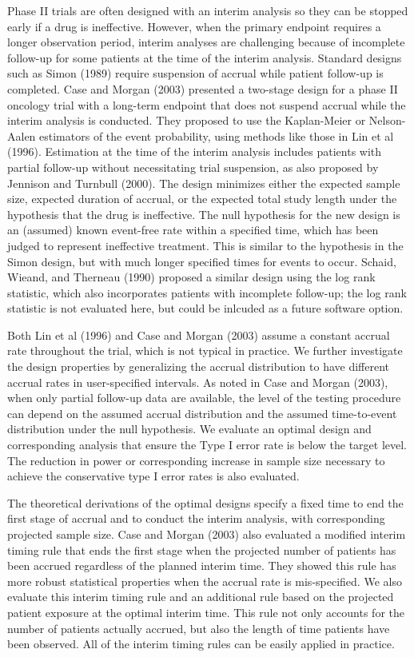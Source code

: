 \documentclass[12pt]{article}
\begin{document}
Phase II trials are often designed with an interim analysis so they can be stopped early if a drug
is ineffective. However, when the primary endpoint requires a longer observation period, interim
analyses are challenging because of incomplete follow-up for some patients at the time of the
interim analysis.  Standard designs such as Simon (1989) require suspension of accrual while
patient follow-up is completed.  Case and Morgan (2003) presented a two-stage design for a phase II
oncology trial with a long-term endpoint that does not suspend accrual while the interim analysis
is conducted.  They proposed to use the Kaplan-Meier or Nelson-Aalen estimators of the event
probability, using methods like those in Lin et al (1996). Estimation at the time of the interim
analysis includes patients with partial follow-up without necessitating trial suspension, as also proposed by Jennison and Turnbull (2000).  The
design minimizes either the expected sample size, expected duration of accrual, or the expected
total study length under the hypothesis that the drug is ineffective. The null hypothesis for the
new design is an (assumed) known event-free rate within a specified time, which has been judged to
represent ineffective treatment.  This is similar to  the hypothesis in the Simon design, but with
much longer specified times for events to occur.  Schaid, Wieand, and Therneau (1990) proposed a
similar design using the log rank statistic, which also incorporates patients with incomplete
follow-up;  the log rank statistic is not evaluated here, but could be inlcuded as a future
software option.


Both Lin et al (1996) and Case and Morgan (2003) assume a constant accrual rate throughout the
trial, which is not typical in practice. We further investigate the design properties by
generalizing the accrual distribution to have different accrual rates in user-specified intervals.
As noted in Case and Morgan (2003), when only partial follow-up data are available, the level of
the testing procedure can depend on the assumed accrual distribution and the assumed time-to-event
distribution under the null hypothesis.  We evaluate an optimal design and corresponding analysis
that ensure the Type I error rate is below the target level.  The reduction in power or
corresponding increase in sample size necessary to achieve the conservative type I error rates is
also evaluated.

The theoretical derivations of the optimal designs specify a fixed time to end the first stage of
accrual and to conduct the interim analysis, with corresponding projected sample size. Case and
Morgan (2003) also evaluated a modified interim timing rule that ends the first stage when the
projected number of patients has been accrued regardless of the planned interim time. They showed
this rule has more robust statistical properties when the accrual rate is mis-specified.  We also
evaluate this interim timing rule and an additional rule based on the projected patient exposure at
the optimal interim time. This rule not only accounts for the number of patients actually accrued,
but also the length of time patients have been observed. All of the interim timing rules can be
easily applied in practice.
\end{document}
